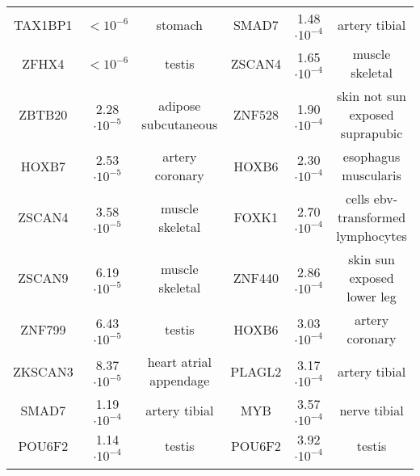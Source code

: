 \documentclass[aoas,preprint]{imsart}
\numberwithin{equation}{section}
\theoremstyle{plain}
\begin{document}
\begin{table}[!htbp]
\begin{tabular}{@{\extracolsep{5pt}} ccc | ccc}
TAX1BP1 & $<10^{-6}$ & stomach & SMAD7 & 1.48$\cdot 10^{-4}$ & artery tibial \\ 
ZFHX4 & $<10^{-6}$ & testis & ZSCAN4 & 1.65$\cdot 10^{-4}$ & muscle skeletal \\ 
ZBTB20 & 2.28$\cdot10^{-5}$ & adipose subcutaneous & ZNF528 & 1.90$\cdot 10^{-4}$ & skin not sun exposed suprapubic \\ 
HOXB7 & 2.53$\cdot10^{-5}$ & artery coronary & HOXB6 & 2.30$\cdot 10^{-4}$ & esophagus muscularis \\ 
ZSCAN4 & 3.58 $\cdot10^{-5}$ & muscle skeletal & FOXK1 & 2.70$\cdot 10^{-4}$ & cells ebv-transformed lymphocytes \\ 
ZSCAN9 & 6.19 $\cdot10^{-5}$ & muscle skeletal & ZNF440 & 2.86$\cdot 10^{-4}$ & skin sun exposed lower leg \\ 
ZNF799 & 6.43 $\cdot10^{-5}$ & testis & HOXB6 & 3.03$\cdot 10^{-4}$ & artery coronary \\ 
ZKSCAN3 & 8.37 $\cdot10^{-5}$ & heart atrial appendage & PLAGL2 & 3.17$\cdot 10^{-4}$ & artery tibial \\
SMAD7 & 1.19 $\cdot10^{-4}$ & artery tibial & MYB & 3.57$\cdot 10^{-4}$ & nerve tibial \\ 
POU6F2 & 1.14$\cdot 10^{-4}$ & testis & POU6F2 & 3.92$\cdot 10^{-4}$ & testis\\
\hline \\[-1.8ex] 
\end{tabular} 
\caption{\label{tab:results}}
\end{table} 
\end{document}

